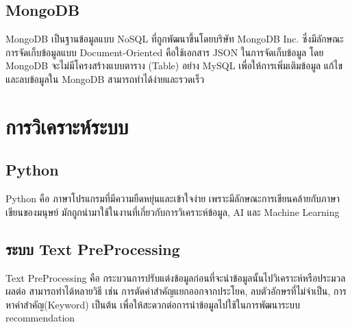\subsection{MongoDB}
MongoDB เป็นฐานข้อมูลแบบ NoSQL ที่ถูกพัฒนาขึ้นโดยบริษัท MongoDB Inc. ซึ่งมีลักษณะการจัดเก็บข้อมูลแบบ Document-Oriented คือใช้เอกสาร JSON ในการจัดเก็บข้อมูล โดย MongoDB จะไม่มีโครงสร้างแบบตาราง (Table) อย่าง MySQL เพื่อให้การเพิ่มเติมข้อมูล แก้ไข และลบข้อมูลใน MongoDB สามารถทำได้ง่ายและรวดเร็ว
\cite{mongo}

\section{การวิเคราะห์ระบบ}
\subsection{Python}
Python คือ ภาษาโปรแกรมที่มีความยืดหยุ่นและเข้าใจง่าย เพราะมีลักษณะการเขียนคล้ายกับภาษาเขียนของมนุษย์ มักถูกนำมาใช้ในงานที่เกี่ยวกับการวิเคราะห์ข้อมูล, AI และ Machine Learning 
\cite{python}
\subsection{ระบบ Text PreProcessing}
Text PreProcessing คือ กระบวนการปรับแต่งข้อมูลก่อนที่จะนำข้อมูลนั้นไปวิเคราะห์หรือประมวลผลต่อ สามารถทำได้หลายวิธี เช่น การตัดคำสำคัญแยกออกจากประโยค, ลบตัวอักษรที่ไม่จำเป็น, การหาคำสำคัญ(Keyword) เป็นต้น เพื่อให้สะดวกต่อการนำข้อมูลไปใช้ในการพัฒนาระบบ recommendation
\cite{prepros}


